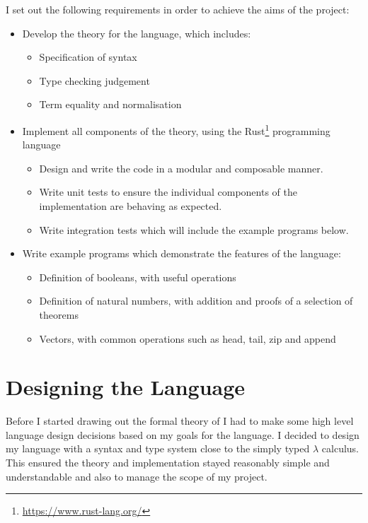 \documentclass[12pt,a4paper,twoside]{report}
\begin{document}
I set out the following requirements in order to achieve the aims of the project:
\begin{itemize}
    \item Develop the theory for the language, which includes:
          \begin{itemize}
              \item Specification of syntax
              \item Type checking judgement
              \item Term equality and normalisation
          \end{itemize}
    \item Implement all components of the theory, using the Rust\footnote{\url{https://www.rust-lang.org/}} programming language
          \begin{itemize}
              \item Design and write the code in a modular and composable manner.
              \item Write unit tests to ensure the individual components of the implementation are behaving as expected.
              \item Write integration tests which will include the example programs below.
          \end{itemize}
    \item Write example programs which demonstrate the features of the language:
          \begin{itemize}
              \item Definition of booleans, with useful operations
              \item Definition of natural numbers, with addition and proofs of a selection of theorems
              \item Vectors, with common operations such as head, tail, zip and append
          \end{itemize}
\end{itemize}

\section{Designing the Language}

Before I started drawing out the formal theory of \pimu{} I had to make some high level language design decisions based on my goals for the language.
I decided to design my language with a syntax and type system close to the simply typed \(\lambda\) calculus.
This ensured the theory and implementation stayed reasonably simple and understandable and also to manage the scope of my project.
\end{document}

